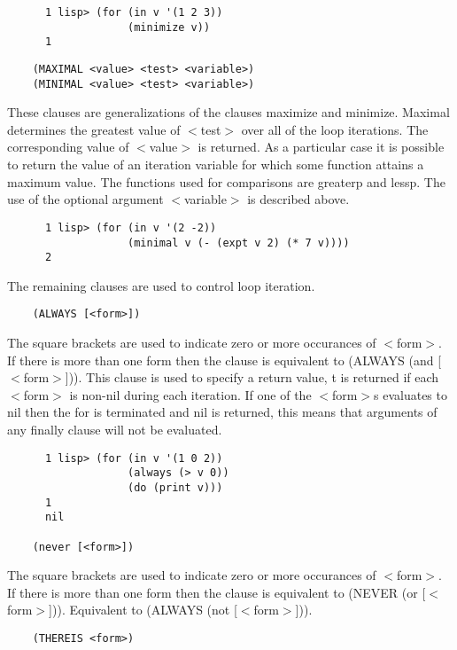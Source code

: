 \begin{verbatim}
      1 lisp> (for (in v '(1 2 3))
                   (minimize v))
      1
\end{verbatim}

\begin{verbatim}
    (MAXIMAL <value> <test> <variable>)
    (MINIMAL <value> <test> <variable>)
\end{verbatim}
      These clauses are generalizations of the clauses maximize and
      minimize.  Maximal determines the greatest value of $<$test$>$
      over all of the loop iterations. The corresponding value of
						$<$value$>$
      is returned. As a particular case it is possible to return the
      value of an iteration variable for which some function attains a
      maximum value. The functions used for comparisons are greaterp
      and lessp. The use of the optional argument $<$variable$>$ is
      described above.

\begin{verbatim}
      1 lisp> (for (in v '(2 -2))
                   (minimal v (- (expt v 2) (* 7 v))))
      2
\end{verbatim}

    The remaining clauses are used to control loop iteration.

\begin{verbatim}
    (ALWAYS [<form>])
\end{verbatim}
      The square brackets are used to indicate zero or more occurances of
      $<$form$>$.  If there is more than one form then the clause is
						equivalent
      to (ALWAYS (and [$<$form$>$])). This clause is used to specify a
						return
      value,  t is returned if each $<$form$>$ is non-nil during each
      iteration.  If one of the $<$form$>$s evaluates to nil then the for
      is terminated and nil is returned, this means that arguments of
      any finally clause will not be evaluated.

\begin{verbatim}
      1 lisp> (for (in v '(1 0 2))
                   (always (> v 0))
                   (do (print v)))
      1
      nil

    (never [<form>])
\end{verbatim}
      The square brackets are used to indicate zero or more occurances of
      $<$form$>$. If there is more than one form then the clause is
						equivalent
      to (NEVER (or [$<$form$>$])).  Equivalent to (ALWAYS (not [$<$form$>$])).

\begin{verbatim}
    (THEREIS <form>)
\end{verbatim}


